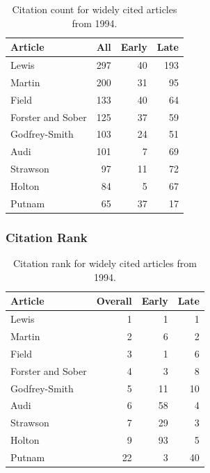 \documentclass[
  10pt,
  letterpaper,
  DIV=11,
  numbers=noendperiod,
  twoside]{scrartcl}
\begin{document}
\begin{longtable}[]{@{}lrrr@{}}

\caption{\label{tbl-citation-count-1994}Citation count for widely cited
articles from 1994.}

\tabularnewline

\toprule\noalign{}
Article & All & Early & Late \\
\midrule\noalign{}
\endhead
\bottomrule\noalign{}
\endlastfoot
Lewis & 297 & 40 & 193 \\
Martin & 200 & 31 & 95 \\
Field & 133 & 40 & 64 \\
Forster and Sober & 125 & 37 & 59 \\
Godfrey-Smith & 103 & 24 & 51 \\
Audi & 101 & 7 & 69 \\
Strawson & 97 & 11 & 72 \\
Holton & 84 & 5 & 67 \\
Putnam & 65 & 37 & 17 \\

\end{longtable}

\subsubsection*{Citation Rank}\label{sec-rank-1994}

\begin{longtable}[]{@{}lrrr@{}}

\caption{\label{tbl-citation-rank-1994}Citation rank for widely cited
articles from 1994.}

\tabularnewline

\toprule\noalign{}
Article & Overall & Early & Late \\
\midrule\noalign{}
\endhead
\bottomrule\noalign{}
\endlastfoot
Lewis & 1 & 1 & 1 \\
Martin & 2 & 6 & 2 \\
Field & 3 & 1 & 6 \\
Forster and Sober & 4 & 3 & 8 \\
Godfrey-Smith & 5 & 11 & 10 \\
Audi & 6 & 58 & 4 \\
Strawson & 7 & 29 & 3 \\
Holton & 9 & 93 & 5 \\
Putnam & 22 & 3 & 40 \\

\end{longtable}
\end{document}
